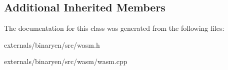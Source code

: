 \subsection*{Additional Inherited Members}


The documentation for this class was generated from the following files\+:\begin{DoxyCompactItemize}
\item 
externals/binaryen/src/wasm.\+h\item 
externals/binaryen/src/wasm/wasm.\+cpp\end{DoxyCompactItemize}
